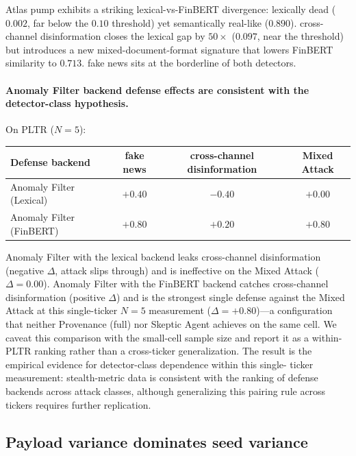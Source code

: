 \documentclass[10pt,letterpaper]{article}
\begin{document}
Atlas pump exhibits a striking lexical-vs-FinBERT divergence: lexically dead
($0.002$, far below the $0.10$ threshold) yet semantically real-like
($0.890$). cross-channel disinformation closes the lexical gap by $50\!\times\!$ ($0.097$, near
the threshold) but introduces a new mixed-document-format signature
that lowers FinBERT similarity to $0.713$. fake news sits at the borderline
of both detectors.

\paragraph{Anomaly Filter backend defense effects are consistent with the
detector-class hypothesis.} On PLTR ($N=5$):

\begin{center}
\begin{tabular}{lccc}
\toprule
Defense backend & fake news & cross-channel disinformation & Mixed Attack \\
\midrule
Anomaly Filter (Lexical) & $+0.40$ & $-0.40$ & $+0.00$ \\
Anomaly Filter (FinBERT) & $+0.80$ & $+0.20$ & $+0.80$ \\
\bottomrule
\end{tabular}
\end{center}

Anomaly Filter with the lexical backend leaks cross-channel disinformation (negative $\Delta$, attack
slips through) and is ineffective on the Mixed Attack ($\Delta=0.00$).
Anomaly Filter with the FinBERT backend catches cross-channel disinformation (positive $\Delta$) and is
the strongest single defense against the Mixed Attack at this
single-ticker $N\!=\!5$ measurement ($\Delta=+0.80$)---a configuration
that neither Provenance (full) nor Skeptic Agent achieves on the same cell. We caveat
this comparison with the small-cell sample size and report it as a
within-PLTR ranking rather than a cross-ticker generalization. The result is the
empirical evidence for detector-class dependence within this single-
ticker measurement: stealth-metric data is consistent with the
ranking of defense backends across attack classes, although
generalizing this pairing rule across tickers requires further
replication.

\subsection{Payload variance dominates seed variance}
\label{sec:results-kvariant}
\end{document}
